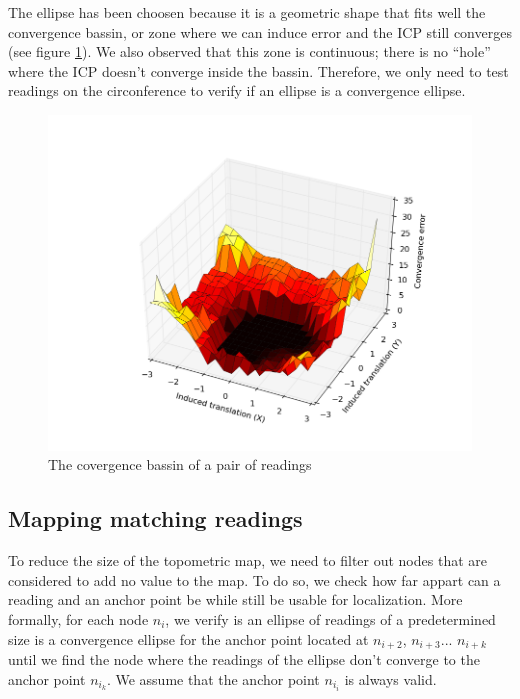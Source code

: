 \documentclass[letterpaper,10 pt,conference]{ieeeconf}
\begin{document}
The ellipse has been choosen because it is a geometric shape that fits well the convergence bassin, or zone where we can induce error and the ICP still
converges (see figure \ref{convergence_bassin}). We also observed that this zone is continuous; there is no ``hole'' where the ICP doesn't converge inside the bassin.
Therefore, we only need to test readings on the circonference to verify if an ellipse is a convergence ellipse.


\begin{figure}[thpb]
  \centering
  \includegraphics[scale=0.4]{convergence_bassin}
  \caption{The covergence bassin of a pair of readings}
  \label{convergence_bassin}
\end{figure}

\subsection{Mapping matching readings}
\label{matching-readings}
To reduce the size of the topometric map, we need to filter out nodes that are considered to add no value to the map. To do so,
we check how far appart can a reading and an anchor point be while still be usable for localization. More formally, for each node
$n_i$, we verify is an ellipse of readings of a predetermined size is a convergence ellipse for the anchor point located at $n_{i+2}$,
$n_{i+3}$... $n_{i+k}$ until we find the node  where the readings of the ellipse don't converge to the anchor point $n_{i_k}$. We assume
that the anchor point $n_{i_i}$ is always valid.
\end{document}
